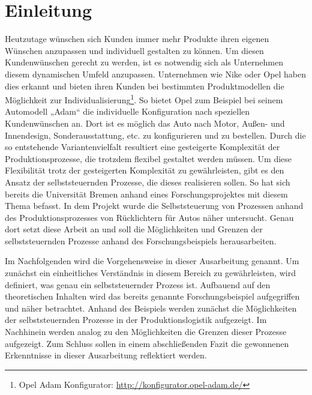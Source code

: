 \section{Einleitung}
\label{sec:Einleitung}

Heutzutage wünschen sich Kunden immer mehr Produkte ihren eigenen Wünschen anzupassen 
und individuell gestalten zu können. Um diesen Kundenwünschen gerecht zu werden, ist es 
notwendig sich als Unternehmen diesem dynamischen Umfeld anzupassen. Unternehmen wie Nike
oder Opel haben dies erkannt und bieten ihren Kunden bei bestimmten Produktmodellen die 
Möglichkeit zur Individualisierung\footnote{Opel Adam Konfigurator: \url{http://konfigurator.opel-adam.de/}}.
So bietet Opel zum Beispiel bei seinem Automodell „Adam“ die individuelle Konfiguration 
nach speziellen Kundenwünschen an. Dort ist es möglich das Auto nach Motor, Außen- und Innendesign, 
Sonderausstattung, etc. zu konfigurieren und zu bestellen. Durch die so entstehende Variantenvielfalt 
resultiert eine gesteigerte Komplexität der Produktionsprozesse, die trotzdem flexibel gestaltet 
werden müssen. Um diese Flexibilität trotz der gesteigerten Komplexität zu gewährleisten, gibt es 
den Ansatz der selbststeuernden Prozesse, die dieses realisieren sollen. So hat sich bereits die 
Universität Bremen anhand eines Forschungsprojektes mit diesem Thema befasst. In dem Projekt wurde 
die Selbststeuerung von Prozessen anhand des Produktionsprozesses von Rücklichtern für Autos näher 
untersucht. Genau dort setzt diese Arbeit an und soll die Möglichkeiten und Grenzen der selbststeuernden 
Prozesse anhand des Forschungsbeispiels herausarbeiten.

Im Nachfolgenden wird die Vorgehensweise in dieser Ausarbeitung genannt. Um zunächst ein einheitliches 
Verständnis in diesem Bereich zu gewährleisten, wird definiert, was genau ein selbststeuernder Prozess ist. 
Aufbauend auf den theoretischen Inhalten wird das bereits genannte Forschungsbeispiel aufgegriffen und 
näher betrachtet. Anhand des Beispiels werden zunächst die Möglichkeiten der selbststeuernden Prozesse 
in der Produktionslogistik aufgezeigt. Im Nachhinein werden analog zu den Möglichkeiten die Grenzen 
dieser Prozesse aufgezeigt. Zum Schluss sollen in einem abschließenden Fazit die gewonnenen Erkenntnisse 
in dieser Ausarbeitung reflektiert werden.
